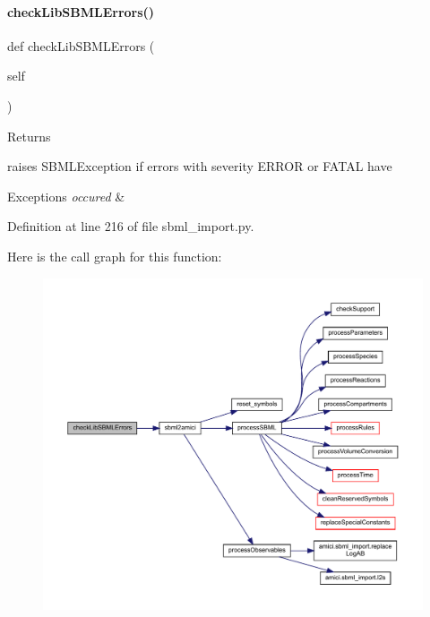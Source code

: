 \paragraph{\texorpdfstring{check\+Lib\+S\+B\+M\+L\+Errors()}{checkLibSBMLErrors()}}
{\footnotesize\ttfamily def check\+Lib\+S\+B\+M\+L\+Errors (\begin{DoxyParamCaption}\item[{}]{self }\end{DoxyParamCaption})}

\begin{DoxyReturn}{Returns}

\end{DoxyReturn}
\begin{DoxyVerb}    raises SBMLException if errors with severity ERROR or FATAL have
\end{DoxyVerb}
 
\begin{DoxyExceptions}{Exceptions}
{\em occured} & \\
\hline
\end{DoxyExceptions}


Definition at line 216 of file sbml\+\_\+import.\+py.

Here is the call graph for this function\+:
\nopagebreak
\begin{figure}[H]
\begin{center}
\leavevmode
\includegraphics[width=350pt]{classamici_1_1sbml__import_1_1_sbml_importer_a0dcfa882a6a14f2d4b83e11552aae318_cgraph}
\end{center}
\end{figure}
\mbox{\label{classamici_1_1sbml__import_1_1_sbml_importer_ae5cdd2444bac89e61e6f717f7736acb6}} 
